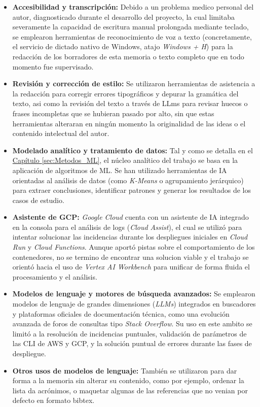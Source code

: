 \begin{itemize}
	\item \textbf{Accesibilidad y transcripción:} Debido a un problema medico personal del autor, diagnosticado durante el desarrollo del proyecto, la cual limitaba severamente la capacidad de escritura manual prolongada mediante teclado, se emplearon herramientas de reconocimiento de voz a texto (concretamente, el servicio de dictado nativo de Windows, atajo \textit{Windows + H}) para la redacción de los borradores de esta memoria o texto completo que en todo momento fue supervisado.
	
	\item \textbf{Revisión y corrección de estilo:} Se utilizaron herramientas de asistencia a la redacción para corregir errores tipográficos y depurar la gramática del texto, asi como la revisión del texto a través de LLms para revisar huecos o frases incompletas que se hubieran pasado por alto, sin que estas herramientas alteraran en ningún momento la originalidad de las ideas o el contenido intelectual del autor.
	
	\item \textbf{Modelado analítico y tratamiento de datos:} Tal y como se detalla en el \hyperref[cap:Materiales y métodos]{Capítulo \ref*{sec:Metodos_ML}}, el núcleo analítico del trabajo se basa en la aplicación de algoritmos de ML. Se han utilizado herramientas de IA orientadas al análisis de datos (como \textit{K-Means} o agrupamiento jerárquico) para extraer conclusiones, identificar patrones y generar los resultados de los casos de estudio.
	
	\item \textbf{Asistente de GCP:} \textit{Google Cloud} cuenta con un asistente de IA integrado en la consola para el análisis de logs (\textit{Cloud Assist}), el cual se utilizó para intentar solucionar las incidencias durante los despliegues iniciales en \textit{Cloud Run} y \textit{Cloud Functions}. Aunque aportó pistas sobre el comportamiento de los contenedores, no se termino de encontrar una solucion viable y el trabajo se orientó hacia el uso de \textit{Vertex AI Workbench} para unificar de forma fluida el procesamiento y el análisis.
	
	\item \textbf{Modelos de lenguaje y motores de búsqueda avanzados:} Se emplearon modelos de lenguaje de grandes dimensiones (\textit{LLMs}) integrados en buscadores y plataformas oficiales de documentación técnica, como una evolución avanzada de foros de consultas tipo \textit{Stack Overflow}. Su uso en este ambito se limitó a la resolución de incidencias puntuales, validación de parámetros de las CLI de AWS y GCP, y la solución puntual de errores durante las fases de despliegue.
	
	\item \textbf{Otros usos de modelos de lenguaje:} También se utilizaron para dar forma a la memoria sin alterar su contenido, como por ejemplo, ordenar la lista da acrónimos, o maquetar algunas de las referencias que no venian por defecto en formato bibtex.
\end{itemize}

\newpage


